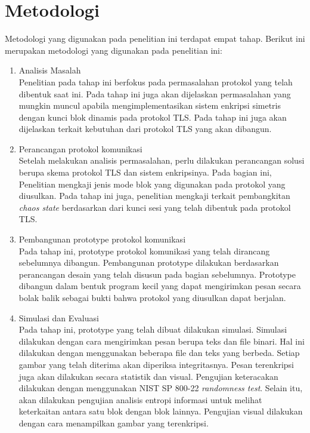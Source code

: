 \section{Metodologi}
Metodologi yang digunakan pada penelitian ini terdapat empat tahap. Berikut ini merupakan metodologi yang digunakan pada penelitian ini:
\begin{enumerate}
  \item Analisis Masalah\\
  Penelitian pada tahap ini berfokus pada permasalahan protokol yang telah dibentuk saat ini. Pada tahap ini juga akan dijelaskan permasalahan yang mungkin muncul apabila mengimplementasikan sistem enkripsi simetris dengan kunci blok dinamis pada protokol TLS. Pada tahap ini juga akan dijelaskan terkait kebutuhan dari protokol TLS yang akan dibangun.

  \item Perancangan protokol komunikasi\\
  Setelah melakukan analisis permasalahan, perlu dilakukan perancangan solusi berupa skema protokol TLS dan sistem enkripsinya. Pada bagian ini, Penelitian mengkaji jenis mode blok yang digunakan pada protokol yang diusulkan. Pada tahap ini juga, penelitian mengkaji terkait pembangkitan \emph{chaos state} berdasarkan dari kunci sesi yang telah dibentuk pada protokol TLS.

  \item Pembangunan prototype protokol komunikasi\\
  Pada tahap ini, prototype protokol komunikasi yang telah dirancang sebelumnya dibangun. Pembangunan prototype dilakukan berdasarkan perancangan desain yang telah disusun pada bagian sebelumnya. Prototype dibangun dalam bentuk program kecil yang dapat mengirimkan pesan secara bolak balik sebagai bukti bahwa protokol yang diusulkan dapat berjalan.

  \item Simulasi dan Evaluasi\\
  Pada tahap ini, prototype yang telah dibuat dilakukan simulasi. Simulasi dilakukan dengan cara mengirimkan pesan berupa teks dan file binari. Hal ini dilakukan dengan menggunakan beberapa file dan teks yang berbeda. Setiap gambar yang telah diterima akan diperiksa integritasnya. Pesan terenkripsi juga akan dilakukan secara statistik dan visual. Pengujian keteracakan dilakukan dengan menggunakan NIST SP 800-22 \emph{randomness test}. Selain itu, akan dilakukan pengujian analisis entropi informasi untuk melihat keterkaitan antara satu blok dengan blok lainnya. Pengujian visual dilakukan dengan cara menampilkan gambar yang terenkripsi.
\end{enumerate}


